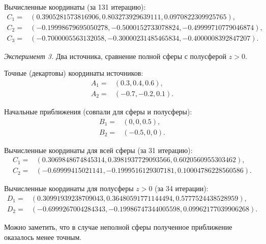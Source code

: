 Вычисленные координаты (за 131 итерацию):
\begin{align}
    C_1 =& (0.3905281573816906, 0.803273929639111, 0.0970822309925765) \text{,}\nonumber\\
    C_2 =& (-0.19998679695050278, -0.5000152733078824, -0.49999710779046874) \text{,}\nonumber\\
    C_3 =& (-0.7000005563132058, -0.30000231485465834, -0.4000008392847207) \text{.}\nonumber
\end{align}

\emph{Эксперимент 3.} Два источника, сравнение полной сферы с полусферой $z > 0$.

Точные (декартовы) координаты источников:
\begin{align}
    A_1 =& (0.3, 0.4, 0.6) \text{,}\nonumber\\
    A_2 =& (-0.7, -0.2, 0.1) \text{.}\nonumber
\end{align}

Начальные приближения (совпали для сферы и полусферы):
\begin{align}
    B_1 =& (0, 0, 0.5) \text{,}\nonumber\\
    B_2 =& (-0.5, 0, 0) \text{.}\nonumber
\end{align}

\newpage
Вычисленные координаты для всей сферы (за 31 итерацию):
\begin{align}
    C_1 =& (0.3069848674845314, 0.3981937729093566, 0.6020560955303462) \text{,}\nonumber\\
    C_2 =& (-0.69999415021141, -0.1999516129307181, 0.10004786228560586) \text{.}\nonumber
\end{align}

Вычисленные координаты для полусферы $z > 0$ (за 34 итерации):
\begin{align}
    D_1 =& (0.30991939238709043, 0.36480591771144494, 0.5777524438528959) \text{,}\nonumber\\
    D_2 =& (-0.6999267004284343, -0.19986747344005598, 0.09962177039906268) \text{.}\nonumber
\end{align}

Можно заметить, что в случае неполной сферы полученное приближение оказалось менее точным.
